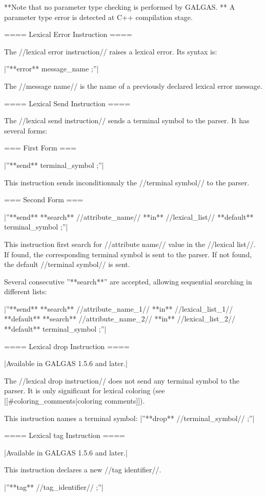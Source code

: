 **Note that no parameter type checking is performed by GALGAS. ** A parameter type error is detected at C++ compilation stage.
 
==== Lexical Error Instruction ====

The //lexical error instruction// raises a lexical error. Its syntax is:

|''**error** message\_name ;''|

The //message name// is the name of a previously declared lexical error message.

==== Lexical Send Instruction ====

The //lexical send instruction// sends a terminal symbol to the parser. It has several forms:

=== First Form ===

|''**send** terminal\_symbol ;''|

This instruction sends inconditionnaly the //terminal symbol// to the parser.

=== Second Form ===

|''**send** **search** //attribute\_name// **in** //lexical\_list// **default** terminal\_symbol ;''|

This instruction first search for //attribute name// value in the //lexical list//. If found, the corresponding terminal symbol is sent to the parser. If not found, the default //terminal symbol// is sent.

Several consecutive ''**search**'' are accepted, allowing sequential searching in different lists:

|''**send** **search** //attribute\_name\_1// **in** //lexical\_list\_1// **default** **search** //attribute\_name\_2// **in** //lexical\_list\_2// **default** terminal\_symbol ;''|

==== Lexical drop Instruction ====

|Available in GALGAS 1.5.6 and later.|


The //lexical drop instruction// does not send any terminal symbol to the parser. It is only significant for lexical coloring (see [[\#coloring\_comments|coloring comments]]).

This instruction names a terminal symbol:
|''**drop** //terminal\_symbol// ;''|


==== Lexical tag Instruction ====

|Available in GALGAS 1.5.6 and later.|

This instruction declares a new //tag identifier//.

|''**tag** //tag\_identifier// ;''|

